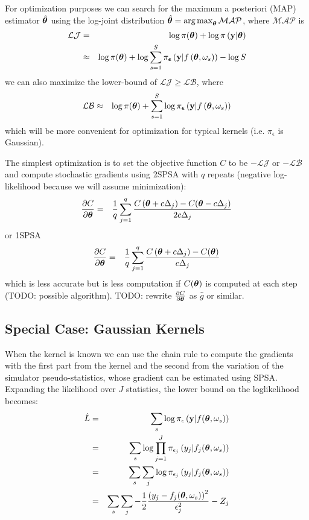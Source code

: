 \documentclass[]{article}
\begin{document}
For optimization purposes we can search for the maximum a posteriori (MAP) estimator $\hat{{\bm \theta}}$ using the log-joint distribution $\hat{{\bm \theta}} = \operatorname*{arg\,max}_{{\bm \theta}} \mathcal{MAP}$, where $\mathcal{MAP}$ is
\begin{eqnarray}
  \mathcal{LJ} &    =    & \log \pi({\bm \theta}) + \log \pi\left( {\bf y} | {\bm \theta} \right) \\
                & \approx &\log \pi({\bm \theta}) + \log \sum_{s=1}^S \pi_{{\bm {\epsilon}}}\left( {\bf y} | f\left( {\bm \theta}, \omega_s \right) \right) - \log S
\end{eqnarray} 
we can also maximize the lower-bound of $\mathcal{LJ} \geq \mathcal{LB}$, where 
\begin{eqnarray}
  \mathcal{LB} & \approx &\log \pi({\bm \theta}) + \sum_{s=1}^S \log  \pi_{{\bm {\epsilon}}}\left( {\bf y} | f\left( {\bm \theta}, \omega_s \right) \right)
\end{eqnarray} 
which will be more convenient for optimization for typical kernels (i.e. $\pi_{\epsilon}$ is Gaussian).

The simplest optimization is to set the objective function  $C$ to be $-\mathcal{LJ}$ or $-\mathcal{LB}$ and compute stochastic gradients using 2SPSA with $q$ repeats (negative log-likelihood because we will assume minimization):
\begin{eqnarray}
  \frac{\partial C}{\partial {\bm \theta}} & = & \frac{1}{q} \sum_{j=1}^{q} \frac{C\left( {\bm \theta} + c \Delta_j\right) - C{\left({\bm \theta} - c \Delta_j\right)}}{2 c \Delta_j}
\end{eqnarray}
or 1SPSA
\begin{eqnarray}
  \frac{\partial C}{\partial {\bm \theta}} & = & \frac{1}{q} \sum_{j=1}^{q}  \frac{C\left( {\bm \theta} + c \Delta_j\right) - C({\bm \theta})}{c \Delta_j}
\end{eqnarray}
which is less accurate but is less computation if $C({\bm \theta})$ is computed at each step (TODO: possible algorithm).  TODO: rewrite $\frac{\partial C}{\partial {\bm \theta}}$ as $\hat{g}$ or similar.

\subsection{Special Case: Gaussian Kernels}
When the kernel is known we can use the chain rule to compute the gradients with the first part from the kernel and the second from the variation of the simulator pseudo-statistics, whose gradient can be estimated using SPSA.  Expanding the likelihood over $J$ statistics, the lower bound on the loglikelihood becomes:
\begin{eqnarray}
  \hat{L} & = & \sum_s \log \pi_{\epsilon}\left( {\bf y} | f({\bm \theta}, \omega_s)\right) \\
          & = & \sum_s \log \prod_{j=1}^J \pi_{\epsilon_j}\left( y_j | f_j({\bm \theta}, \omega_s)\right) \\
          & = & \sum_s \sum_j \log  \pi_{\epsilon_j}\left( y_j | f_j({\bm \theta}, \omega_s)\right) \\
          & = & \sum_s \sum_j -\frac{1}{2} \frac{\left( y_j - f_j({\bm \theta}, \omega_s)\right)^2}{\epsilon_j^2} - Z_j \\
\end{eqnarray}
\end{document}
